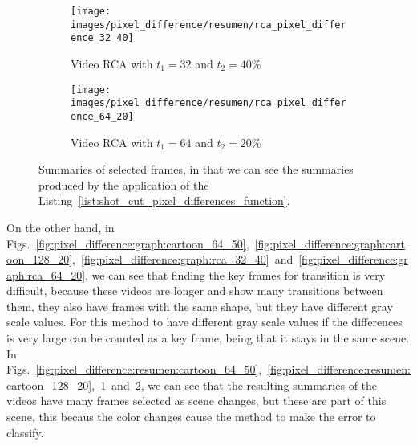 \documentclass[journal]{IEEEtran}
\begin{document}
\begin{figure}
	\centering
	\begin{subfigure}{0.23\textwidth}
		\centering
		\texttt{[image: images/pixel\_difference/resumen/rca\_pixel\_difference\_32\_40]} 
		\caption{Video RCA with $t_1 = 32$ and $t_2 = 40\%$}
		\label{fig:pixel_difference:resumen:rca_32_40} 
	\end{subfigure}
	\centering
	\begin{subfigure}{0.23\textwidth}
		\centering
		\texttt{[image: images/pixel\_difference/resumen/rca\_pixel\_difference\_64\_20]}
		\caption{Video RCA with $t_1 = 64$ and $t_2 = 20\%$}
		\label{fig:pixel_difference:resumen:rca_64_20}
	\end{subfigure}
	
	\caption{Summaries of selected frames, in that we can see the summaries produced by the application of the Listing~\ref{list:shot_cut_pixel_differences_function}.}
	\label{fig:pixel_difference:resumen}
\end{figure}



On the other hand, in Figs.~\ref{fig:pixel_difference:graph:cartoon_64_50},~\ref{fig:pixel_difference:graph:cartoon_128_20},~\ref{fig:pixel_difference:graph:rca_32_40}~and~\ref{fig:pixel_difference:graph:rca_64_20}, we can see that finding the key frames for transition is very difficult, because these videos are longer and show many transitions between them, they also have frames with the same shape, but they have different gray scale values. For this method to have different gray scale values if the differences is very large can be counted as a key frame, being that it stays in the same scene. In Figs.~\ref{fig:pixel_difference:resumen:cartoon_64_50},~\ref{fig:pixel_difference:resumen:cartoon_128_20},~\ref{fig:pixel_difference:resumen:rca_32_40}~and~\ref{fig:pixel_difference:resumen:rca_64_20}, we can see that the resulting summaries of the videos have many frames selected as scene changes, but these are part of this scene, this becaus the color changes cause the method to make the error to classify.
\end{document}

